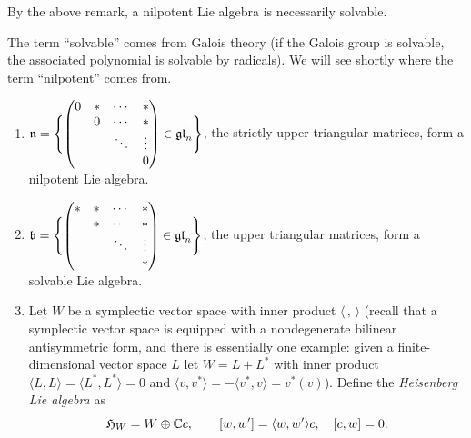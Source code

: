 By the above remark, a nilpotent Lie algebra is necessarily solvable.

\begin{remark}
The term ``solvable'' comes from Galois theory (if the Galois group is
solvable, the associated polynomial is solvable by radicals). We will see
shortly where the term ``nilpotent'' comes from.
\end{remark}

\begin{example}\leavevmode
\begin{enumerate}
  \item $\mathfrak{n} = \Biggl\{ \begin{pmatrix}
            0 & * & \cdots & *\\
              & 0 & \cdots & *\\
              &   & \ddots & \vdots\\
              &   &        & 0
          \end{pmatrix} \in \mathfrak{gl}_n \Biggr\}$, the strictly upper triangular
    matrices, form a nilpotent Lie algebra.
  \item $\mathfrak{b} = \Biggl\{ \begin{pmatrix}
            * & * & \cdots & *\\
              & * & \cdots & *\\
              &   & \ddots & \vdots\\
              &   &        & *
          \end{pmatrix} \in \mathfrak{gl}_n \Biggr\}$, the upper triangular matrices,
    form a solvable Lie algebra.

    \begin{exercise}[Essential]\leavevmode
    \end{exercise}
  \item Let $W$ be a symplectic vector space with inner product
    $\langle\,,\,\rangle$ (recall that a symplectic vector space is equipped
    with a nondegenerate bilinear antisymmetric form, and there is essentially
    one example: given a finite-dimensional vector space $L$ let
    $W = L + L^*$ with inner product
    $\langle L, L\rangle = \langle L^*, L^*\rangle = 0$ and
    $\langle v, v^*\rangle = -\langle v^*, v\rangle = v^*(v)$). Define the
    \emph{Heisenberg Lie algebra} as
    \[
      \mathfrak{H}_W = W \oplus \mathbb{C} c, \qquad [w, w'] = \langle w, w'\rangle c, \quad [c, w] = 0.
    \]


\end{enumerate}
\end{example}
